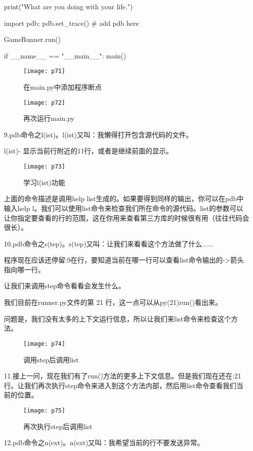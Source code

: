 \documentclass[a4paper ,12pt]{article}
\begin{document}
	print("What are you doing with your life.")
	
	import pdb; pdb.set\_trace() \# add pdb here
	
	GameRunner.run()
	
	
	if \_\_name\_\_ == "\_\_main\_\_":
	main()
	\begin{figure}[h]
		\centering
		\texttt{[image: p71]}
		\caption{在main.py中添加程序断点}
	\end{figure}
	
	\begin{figure}[h]
		\centering
		\texttt{[image: p72]}
		\caption{再次运行main.py}
	\end{figure}
	
	9.pdb命令之l(ist)。l(ist)又叫：我懒得打开包含源代码的文件。
	
	l(ist)- 显示当前行附近的11行，或者是继续前面的显示。
	\begin{figure}[h]
		\centering
		\texttt{[image: p73]}
		\caption{学习l(ist)功能}
	\end{figure}
	上面的命令描述是调用help list生成的。如果要得到同样的输出，你可以在pdb中输入help l。我们可以使用list命令来检查我们所在命令的源代码。list的参数可以让你指定要查看的行的范围，这在你用来查看第三方库的时候很有用（往往代码会很长）。
	
	10.pdb命令之s(tep)。s(tep)又叫：让我们来看看这个方法做了什么......
	
	程序现在应该还停留:9在行，要知道当前在哪一行可以查看list命令输出的->箭头指向哪一行。
	
	让我们来调用step命令看看会发生什么。
	
	我们目前在runner.py文件的第 21 行，这一点可以从py(21)run()看出来。
	
	问题是，我们没有太多的上下文运行信息，所以让我们来list命令来检查这个方法。
	\begin{figure}[h]
		\centering
		\texttt{[image: p74]}
		\caption{调用step后调用list}
	\end{figure}
	
	11.接上一问，现在我们有了run()方法的更多上下文信息。但是我们现在还在:21行。让我们再次执行step命令来进入到这个方法内部，然后用list命令查看我们当前的位置。
	\begin{figure}[h]
		\centering
		\texttt{[image: p75]}
		\caption{再次执行step后调用list}
	\end{figure}
	
	12.pdb命令之n(ext)。n(ext)又叫：我希望当前的行不要发送异常。
	
\end{document}
